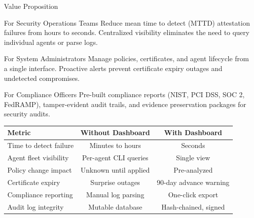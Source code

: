 \begin{frame}{Value Proposition}
  \begin{block}{For Security Operations Teams}
    \scriptsize
    Reduce mean time to detect (MTTD) attestation failures from hours to seconds.
    Centralized visibility eliminates the need to query individual agents or parse logs.
  \end{block}

  \vspace{0.1cm}

  \begin{block}{For System Administrators}
    \scriptsize
    Manage policies, certificates, and agent lifecycle from a single interface.
    Proactive alerts prevent certificate expiry outages and undetected compromises.
  \end{block}

  \vspace{0.1cm}

  \begin{block}{For Compliance Officers}
    \scriptsize
    Pre-built compliance reports (NIST, PCI DSS, SOC 2, FedRAMP), tamper-evident
    audit trails, and evidence preservation packages for security audits.
  \end{block}

  \vspace{0.1cm}

  \scriptsize
  \begin{center}
    \begin{tabular}{|l|c|c|}
      \hline
      \textbf{Metric} & \textbf{Without Dashboard} & \textbf{With Dashboard} \\
      \hline
      Time to detect failure & Minutes to hours & Seconds \\
      \hline
      Agent fleet visibility & Per-agent CLI queries & Single view \\
      \hline
      Policy change impact & Unknown until applied & Pre-analyzed \\
      \hline
      Certificate expiry & Surprise outages & 90-day advance warning \\
      \hline
      Compliance reporting & Manual log parsing & One-click export \\
      \hline
      Audit log integrity & Mutable database & Hash-chained, signed \\
      \hline
    \end{tabular}
  \end{center}
\end{frame}

